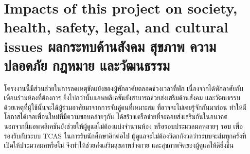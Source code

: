 \section{\ifenglish%
      Impacts of this project on society, health, safety, legal, and cultural issues
  \else%
      ผลกระทบด้านสังคม สุขภาพ ความปลอดภัย กฎหมาย และวัฒนธรรม
  \fi}

โครงงานนี้มีส่วนช่วยในการลดเหตุขัดแย้งของผู้พักอาศัยตลอดช่วงเวลาที่พัก
เนื่องจากได้พักอาศัยกับเพื่อนร่วมห้องที่ต้องการ ยิ่งไปกว่านั้นแอพพลิเคชันยังสามารถช่วยส่งเสริมด้านสังคม 
และวัฒนธรรม ด้วยเหตุที่ผู้ใช้นั้นจะได้ผู้ร่วมอาศัยมาจากการจับคู่คนที่เหมาะสม ที่อาจจะไม่เคยรู้จักกันมาก่อน ทำให้มีโอกาสได้เจอเพื่อนใหม่ที่มีความชอบคล้ายๆกัน 
ได้สร้างเครือข่ายที่จะคอยส่งเสริมกันในอนาคต นอกจากนี้แอพพลิเคชันยังช่วยให้ผู้ดูแลไม่ต้องแบ่งจำนวนห้อง 
หรือรอบประมวลผลหลายๆ รอบ เพื่อรองรับกับระบบ TCAS ในการรับนักศึกษาอีกต่อไป
ผู้ดูแลจะไม่ต้องวิตกกังวลว่าระบบจะล่มทุกครั้งที่เปิดให้ประมวลผลหรือไม่ จึงทำให้ช่วยส่งเสริมสุขภาพร่างกาย 
และสุขภาพจิตของผู้ดูแลให้ดียิ่งขึ้น


